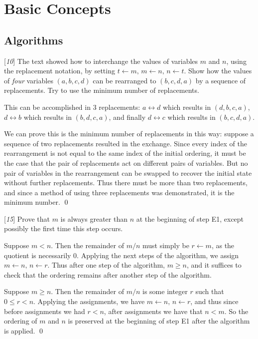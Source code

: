 \chapter{Basic Concepts}
\section{Algorithms}

 [\textit{10}] The text showed how to interchange the values of variables $m$ and $n$, using the replacement notation, by setting $t \leftarrow m, \, m \leftarrow n, \, n \leftarrow t$. Show how the values of \textit{four} variables $(a, b, c, d)$ can be rearranged to $(b, c, d, a)$ by a sequence of replacements. Try to use the minimum number of replacements.

\sol This can be accomplished in 3 replacements: $a \leftrightarrow d$ which results in $(d, b, c, a)$, $d \leftrightarrow b$ which results in $(b, d, c, a)$, and finally $d \leftrightarrow c$ which results in $(b, c, d, a)$.

We can prove this is the minimum number of replacements in this way: suppose a sequence of two replacements resulted in the exchange. Since every index of the rearrangement is not equal to the same index of the initial ordering, it must be the case that the pair of replacements act on different pairs of variables. But no pair of variables in the rearrangement can be swapped to recover the initial state without further replacements. Thus there must be more than two replacements, and since a method of using three replacements was demonstrated, it is the minimum number. \qed

 [\textit{15}] Prove that $m$ is always greater than $n$ at the beginning of step E1, except possibly the first time this step occurs.

\pf Suppose $m < n$. Then the remainder of $m / n$ must simply be $r \leftarrow m$, as the quotient is necessarily 0. Applying the next steps of the algorithm, we assign $m \leftarrow n, \, n \leftarrow r$. Thus after one step of the algorithm, $m \geq n$, and it suffices to check that the ordering remains after another step of the algorithm.

Suppose $m \geq n$. Then the remainder of $m / n$ is some integer $r$ such that $0 \leq r < n$. Applying the assignments, we have $m \leftarrow n, \, n \leftarrow r$, and thus since before assignments we had $r < n$, after assignments we have that $n < m$. So the ordering of $m$ and $n$ is preserved at the beginning of step E1 after the algorithm is applied. \qed

